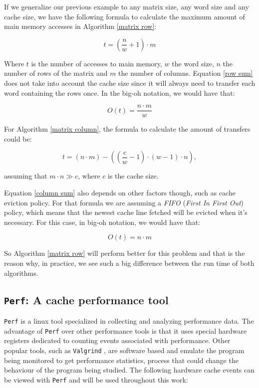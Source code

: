\documentclass[12pt]{diicc}
\begin{document}
If we generalize our previous example to any matrix size, any word size and any cache size, we have the following formula to calculate the maximum amount of main memory accesses in Algorithm \ref{matrix row}:

\begin{equation}\label{row sum}
t=\left (\frac{n}{w} + 1 \right) \cdot m
\end{equation}

Where $t$ is the number of accesses to main memory, $w$ the word size, $n$ the number of rows of the matrix and $m$ the number of columns. Equation \eqref{row sum} does not take into account the cache size since it will always need to transfer each word containing the rows once. In the big-oh notation, we would have that:

\[ O(t)=\frac{n \cdot m}{w} \]

For Algorithm \ref{matrix column}, the formula to calculate the amount of transfers could be:

\begin{equation}\label{column sum}
t=(n \cdot m) - \left(\left(\frac{c}{w}-1\right)\cdot \left(w-1\right)\cdot n\right),
\end{equation}

assuming that $m\cdot n\gg c$, where $c$ is the cache size.

Equation \eqref{column sum} also depends on other factors though, such as cache eviction policy. For that formula we are assuming a \textit{FIFO} (\textit{First In First Out}) policy, which means that the newest cache line fetched will be evicted when it's necessary. For this case, in big-oh notation, we would have that:

\[ O(t)=n \cdot m \]

So Algorithm \ref{matrix row} will perform better for this problem and that is the reason why, in practice, we see such a big difference between the run time of both algorithms. 

\subsection{\texttt{Perf}: A cache performance tool}

\texttt{Perf} \cite{perf} is a linux tool specialized in collecting and analyzing performance data. The advantage of \texttt{Perf} over other performance tools is that it uses special hardware registers dedicated to counting events associated with performance. Other popular tools, such as \texttt{Valgrind} \cite{valgrind}, are software based and emulate the program being monitored to get performance statistics, process that could change the behaviour of the program being studied. The following hardware cache events can be viewed with \texttt{Perf} and will be used throughout this work:
\end{document}
